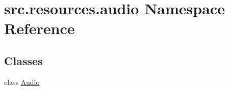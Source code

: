 \hypertarget{namespacesrc_1_1resources_1_1audio}{\section{src.\+resources.\+audio Namespace Reference}
\label{namespacesrc_1_1resources_1_1audio}
}
\subsection*{Classes}
\begin{DoxyCompactItemize}
\item 
class \hyperlink{classsrc_1_1resources_1_1audio_1_1_audio}{Audio}
\end{DoxyCompactItemize}
